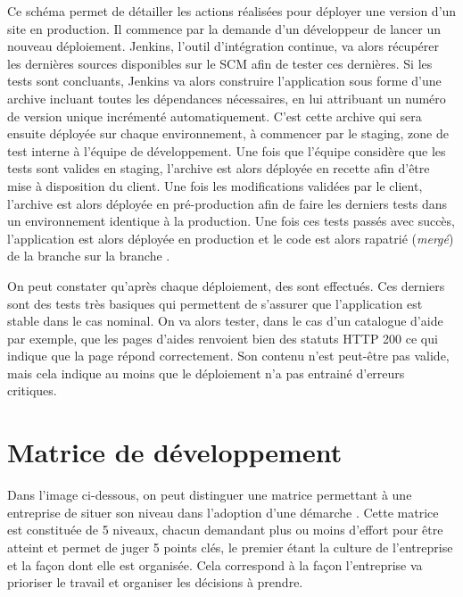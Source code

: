 Ce schéma permet de détailler les actions réalisées pour déployer une version d'un site \naq{} en production. Il commence par la demande d'un développeur de lancer un nouveau déploiement. Jenkins, l'outil d'intégration continue, va alors récupérer les dernières sources disponibles sur le \gls{SCM} afin de tester ces dernières. Si les tests sont concluants, Jenkins va alors construire l'application sous forme d'une archive incluant toutes les dépendances nécessaires, en lui attribuant un numéro de version unique incrémenté automatiquement. C'est cette archive qui sera ensuite déployée sur chaque environnement, à commencer par le staging, zone de test interne à l'équipe de développement. Une fois que l'équipe considère que les tests sont valides en staging, l'archive est alors déployée en recette afin d'être mise à disposition du client. Une fois les modifications validées par le client, l'archive est alors déployée en pré-production afin de faire les derniers tests dans un environnement identique à la production. Une fois ces tests passés avec succès, l'application est alors déployée en production et le code est alors rapatrié (\emph{mergé}) de la branche  sur la branche . 

On peut constater qu'après chaque déploiement, des  sont effectués. Ces derniers sont des tests très basiques qui permettent de s'assurer que l'application est stable dans le cas nominal. On va alors tester, dans le cas d'un catalogue d'aide par exemple, que les pages d'aides renvoient bien des statuts \gls{HTTP} 200 ce qui indique que la page répond correctement. Son contenu n'est peut-être pas valide, mais cela indique au moins que le déploiement n'a pas entrainé d'erreurs critiques. 


\clearpage
\section{Matrice de développement \devops}\label{annexe:devops-matrice}

Dans l'image ci-dessous, on peut distinguer une matrice permettant à une entreprise de situer son niveau dans l'adoption d'une démarche \devops. Cette matrice est constituée de 5 niveaux, chacun demandant plus ou moins d'effort pour être atteint et permet de juger 5 points clés, le premier étant la culture de l'entreprise et la façon dont elle est organisée. Cela correspond à la façon l'entreprise va prioriser le travail et organiser les décisions à prendre.

